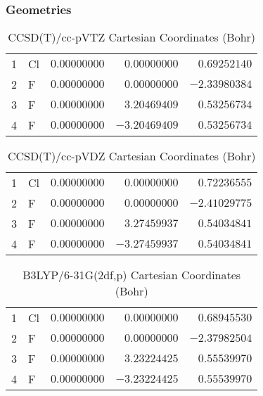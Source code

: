 \documentclass[10pt,oneside]{article}
\begin{document}
\clearpage

\subsection{\ \ \ }

\subsubsection*{Geometries}
\begin{table}[h!]
\centering
\caption{CCSD(T)/cc-pVTZ Cartesian Coordinates (Bohr)}
\begin{tabular}{llrrr}
1  & Cl & $ 0.00000000$ & $ 0.00000000$ & $ 0.69252140$ \\
2  & F  & $ 0.00000000$ & $ 0.00000000$ & $-2.33980384$ \\
3  & F  & $ 0.00000000$ & $ 3.20469409$ & $ 0.53256734$ \\
4  & F  & $ 0.00000000$ & $-3.20469409$ & $ 0.53256734$ \\
\end{tabular}
\end{table}

\begin{table}[h!]
\centering
\caption{CCSD(T)/cc-pVDZ Cartesian Coordinates (Bohr)}
\begin{tabular}{llrrr}
1  & Cl & $ 0.00000000$ & $ 0.00000000$ & $ 0.72236555$ \\
2  & F  & $ 0.00000000$ & $ 0.00000000$ & $-2.41029775$ \\
3  & F  & $ 0.00000000$ & $ 3.27459937$ & $ 0.54034841$ \\
4  & F  & $ 0.00000000$ & $-3.27459937$ & $ 0.54034841$ \\
\end{tabular}
\end{table}

\begin{table}[h!]
\centering
\caption{B3LYP/6-31G(2df,p) Cartesian Coordinates (Bohr)}
\begin{tabular}{llrrr}
1  & Cl & $ 0.00000000$ & $ 0.00000000$ & $ 0.68945530$ \\
2  & F  & $ 0.00000000$ & $ 0.00000000$ & $-2.37982504$ \\
3  & F  & $ 0.00000000$ & $ 3.23224425$ & $ 0.55539970$ \\
4  & F  & $ 0.00000000$ & $-3.23224425$ & $ 0.55539970$ \\
\end{tabular}
\end{table}
\end{document}
